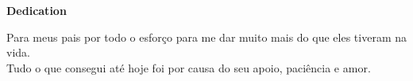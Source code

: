 \pagebreak

\vspace*{\fill} %
\begin{center} %

\begin{large}
\textbf{Dedication} \\
\end{large}
\indent Para meus pais por todo o esforço para me dar muito mais do que eles tiveram na vida. \\
\indent Tudo o que consegui até hoje foi por causa do seu apoio, paciência e amor.

\end{center}
\vspace*{\fill}
\pagebreak

\tableofcontents
\pagebreak

\listoftables
\pagebreak

\listoffigures
\pagebreak